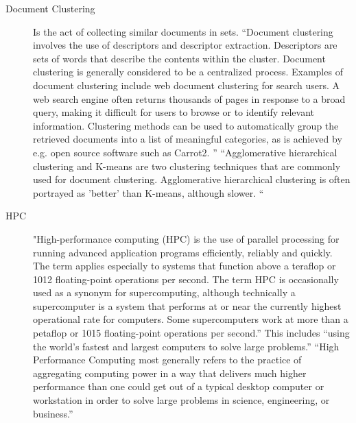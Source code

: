 \documentclass[fleqn,10pt]{SelfArx} %
\begin{document}
\begin{description}
	\item[Document Clustering] Is the act of collecting similar documents in sets. “Document clustering involves the use of descriptors and descriptor extraction. Descriptors are sets of words that describe the contents within the cluster. Document clustering is generally considered to be a centralized process. Examples of document clustering include web document clustering for search users.
	A web search engine often returns thousands of pages in response to a broad query, making it difficult for users to browse or to identify relevant information. Clustering methods can be used to automatically group the retrieved documents into a list of meaningful categories, as is achieved by e.g. open source software such as Carrot2.
	” \cite{document clustering}
	“Agglomerative hierarchical clustering and K-means are two clustering techniques that are commonly used for document clustering. Agglomerative hierarchical clustering is often portrayed as 'better' than K-means, although slower. “ \cite{Doc_clust_techniques}
	
	\item[HPC] 
	"High-performance computing (HPC) is the use of parallel processing for running advanced application programs efficiently, reliably and quickly. The term applies especially to systems that function above a teraflop or 1012 floating-point operations per second. The term HPC is occasionally used as a synonym for supercomputing, although technically a supercomputer is a system that performs at or near the currently highest operational rate for computers. Some supercomputers work at more than a petaflop or 1015 floating-point operations per second.” \cite{hpc_def} This includes “using the world's fastest and largest computers to solve large problems.” \cite{parallel_comp_lawrence_nat_lab}
	“High Performance Computing most generally refers to the practice of aggregating computing power in a way that delivers much higher performance than one could get out of a typical desktop computer or workstation in order to solve large problems in science, engineering, or business.” \cite{hpc}
	
\end{description}

\end{document}
